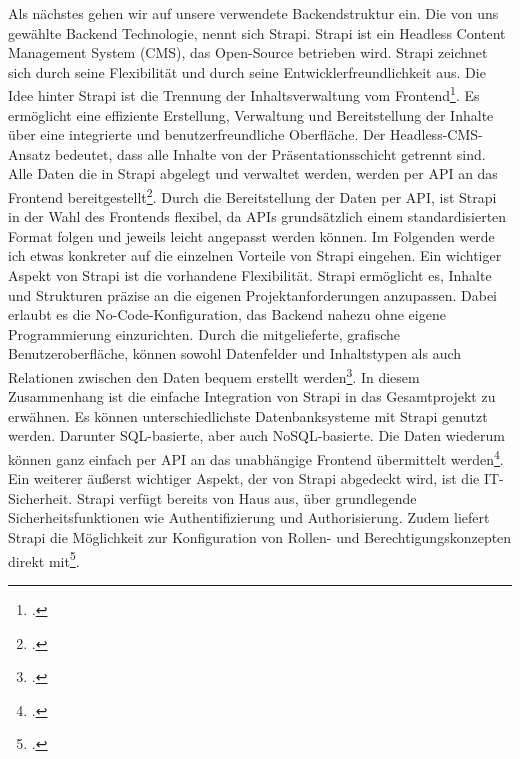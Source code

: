 Als nächstes gehen wir auf unsere verwendete Backendstruktur ein. Die von uns gewählte Backend Technologie, nennt sich Strapi.
Strapi ist ein Headless Content Management System (CMS), das Open-Source betrieben wird. Strapi zeichnet sich durch seine Flexibilität und durch seine Entwicklerfreundlichkeit aus. Die Idee hinter Strapi ist die Trennung der Inhaltsverwaltung vom Frontend\footcite{autor_strapi_2024}.
Es ermöglicht eine effiziente Erstellung, Verwaltung und Bereitstellung der Inhalte über eine integrierte und benutzerfreundliche Oberfläche. Der Headless-CMS-Ansatz bedeutet, dass alle Inhalte von der Präsentationsschicht getrennt sind. Alle Daten die in Strapi abgelegt und verwaltet werden, werden per API an das Frontend bereitgestellt\footcite{behrens_headless-cms_nodate}.
Durch die Bereitstellung der Daten per API, ist Strapi in der Wahl des Frontends flexibel, da APIs grundsätzlich einem standardisierten Format folgen und jeweils leicht angepasst werden können. 
Im Folgenden werde ich etwas konkreter auf die einzelnen Vorteile von Strapi eingehen.
Ein wichtiger Aspekt von Strapi ist die vorhandene Flexibilität. Strapi ermöglicht es, Inhalte und Strukturen präzise an die eigenen Projektanforderungen anzupassen. Dabei erlaubt es die No-Code-Konfiguration, das Backend nahezu ohne eigene Programmierung einzurichten. Durch die mitgelieferte, grafische Benutzeroberfläche, können sowohl Datenfelder und Inhaltstypen als auch Relationen zwischen den Daten bequem erstellt werden\footcite{viehmann_headless_2024}.
In diesem Zusammenhang ist die einfache Integration von Strapi in das Gesamtprojekt zu erwähnen. Es können unterschiedlichste Datenbanksysteme mit Strapi genutzt werden. Darunter SQL-basierte, aber auch NoSQL-basierte. Die Daten wiederum können ganz einfach per API an das unabhängige Frontend übermittelt werden\footcite{autor_strapi_nodate}.
Ein weiterer äußerst wichtiger Aspekt, der von Strapi abgedeckt wird, ist die IT-Sicherheit. Strapi verfügt bereits von Haus aus, über grundlegende Sicherheitsfunktionen wie Authentifizierung und Authorisierung. Zudem liefert Strapi die Möglichkeit zur Konfiguration von Rollen- und Berechtigungskonzepten direkt mit\footcite{siever_basics_2024}.